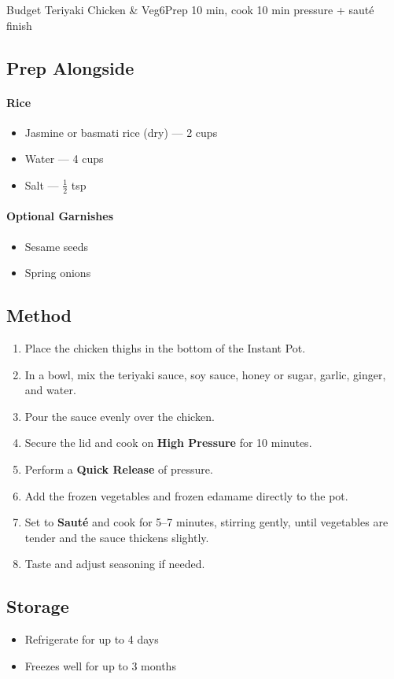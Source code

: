 \begin{recipebox}{Budget Teriyaki Chicken \& Veg}{6}{Prep 10 min, cook 10 min pressure + sauté finish}
\subsection*{Prep Alongside}

\paragraph{Rice}
\begin{itemize}
    \item Jasmine or basmati rice (dry) — 2 cups
    \item Water — 4 cups
    \item Salt — $\tfrac{1}{2}$ tsp
\end{itemize}

\paragraph{Optional Garnishes}
\begin{itemize}
    \item Sesame seeds
    \item Spring onions
\end{itemize}

\subsection*{Method}
\begin{enumerate}
    \item Place the chicken thighs in the bottom of the Instant Pot.
    \item In a bowl, mix the teriyaki sauce, soy sauce, honey or sugar, garlic, ginger, and water.
    \item Pour the sauce evenly over the chicken.
    \item Secure the lid and cook on \textbf{High Pressure} for 10 minutes.
    \item Perform a \textbf{Quick Release} of pressure.
    \item Add the frozen vegetables and frozen edamame directly to the pot.
    \item Set to \textbf{Sauté} and cook for 5--7 minutes, stirring gently, until vegetables are tender and the sauce thickens slightly.
    \item Taste and adjust seasoning if needed.
\end{enumerate}

\subsection*{Storage}
\begin{itemize}
    \item Refrigerate for up to 4 days
    \item Freezes well for up to 3 months
\end{itemize}


\end{recipebox}
